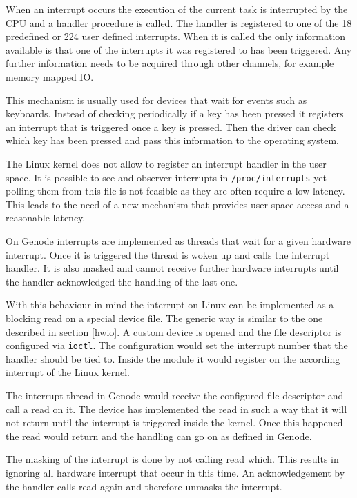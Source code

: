 \documentclass[
a4paper,
12pt,
notitlepage,
parskip=half,
DIV=11,
]{scrbook}
\begin{document}
		When an interrupt occurs the execution of the current task is interrupted by the CPU and a handler procedure is called.
		The handler is registered to one of the 18 predefined or 224 user defined interrupts.
		When it is called the only information available is that one of the interrupts it was registered to has been triggered.
		Any further information needs to be acquired through other channels, for example memory mapped IO. \citep{intelmanual}
		
		This mechanism is usually used for devices that wait for events such as keyboards.
		Instead of checking periodically if a key has been pressed it registers an interrupt that is triggered once a key is pressed.
		Then the driver can check which key has been pressed and pass this information to the operating system.
		
		The Linux kernel does not allow to register an interrupt handler in the user space.
		It is possible to see and observer interrupts in \texttt{/proc/interrupts} yet polling them from this file is not feasible as they are often require a low latency.
		This leads to the need of a new mechanism that provides user space access and a reasonable latency.
		
		On Genode interrupts are implemented as threads that wait for a given hardware interrupt.
		Once it is triggered the thread is woken up and calls the interrupt handler.
		It is also masked and cannot receive further hardware interrupts until the handler acknowledged the handling of the last one. \citep{genode}
		
		With this behaviour in mind the interrupt on Linux can be implemented as a blocking read on a special device file.
		The generic way is similar to the one described in section \ref{hwio}.
		A custom device is opened and the file descriptor is configured via \texttt{ioctl}.
		The configuration would set the interrupt number that the handler should be tied to.
		Inside the module it would register on the according interrupt of the Linux kernel.
		
		The interrupt thread in Genode would receive the configured file descriptor and call a read on it.
		The device has implemented the read in such a way that it will not return until the interrupt is triggered inside the kernel.
		Once this happened the read would return and the handling can go on as defined in Genode.
		
		The masking of the interrupt is done by not calling read which.
		This results in ignoring all hardware interrupt that occur in this time.
		An acknowledgement by the handler calls read again and therefore unmasks the interrupt.
		
\end{document}
